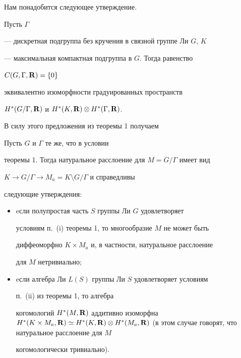 Нам понадобится следующее утверждение.





\begin{prop}


Пусть $\Gamma$


--- дискретная подгруппа без кручения в связной группе Ли $G$, $K$


--- максимальная компактная подгруппа в $G$. Тогда равенство


$C(G, \Gamma, \bold R) = \{ 0 \}$


эквивалентно изоморфности градуированных пространств


$H^\ast (G/ \Gamma,\bold R)$ и $ H^\ast (K,\bold R) \otimes H^\ast


(\Gamma, \bold R)$.


\end{prop}





В силу этого предложения из теоремы 1 получаем





\begin{cornonum}


Пусть $G$ и $\Gamma$ те же, что в условии


теоремы 1. Тогда натуральное расслоение для $M=G/\Gamma$ имеет вид


$K \to G/\Gamma \to M_a=K\setminus G/\Gamma$ и справедливы


следующие утверждения:


\begin{itemize}


\item[(i)] eсли полупростая часть $S$ группы Ли $G$ удовлетворяет


условиям п.~(i) теоремы 1, то многообразие $M$ не может быть


диффеоморфно $K \times M_a$ и, в частности, натуральное расслоение


для $M$ нетривиально;


\item[(ii)] eсли алгебра Ли $L(S)$ группы Ли $S$ удовлетворяет условиям


п.~(ii) из теоремы 1, то алгебра


когомологий $H^\ast (M,\bold R)$ аддитивно изоморфна $H^\ast (K


\times M_a, \bold R) \simeq H^\ast (K,\bold R) \otimes H^\ast (M_a ,


\bold R)$ (в этом случае говорят, что натуральное расслоение для $M$


когомологически тривиально).


\end{itemize}


\end{cornonum}





